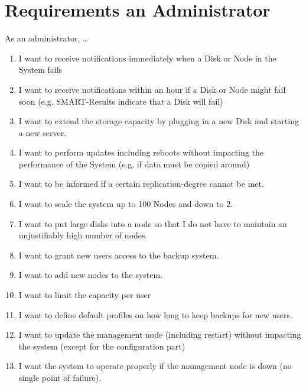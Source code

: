 \section{Requirements an Administrator}

As an administrator, \ldots{}

\begin{enumerate}
	\item
	I want to receive notifications immediately when a Disk or Node in the
	System fails
	\item
	I want to receive notifications within an hour if a Disk or Node might
	fail soon (e.g. SMART-Results indicate that a Disk will fail)
	\item
	I want to extend the storage capacity by plugging in a new Disk and
	starting a new server.
	\item
	I want to perform updates including reboots without impacting the
	performance of the System (e.g. if data must be copied around)
	\item
	I want to be informed if a certain replication-degree cannot be met.
	\item
	I want to scale the system up to 100 Nodes and down to 2.
	\item
	I want to put large disks into a node so that I do not have to
	maintain an unjustifiably high number of nodes.
	\item
	I want to grant new users access to the backup system.
	\item
	I want to add new nodes to the system.
	\item
	I want to limit the capacity per user
	\item
	I want to define default profiles on how long to keep backups for new
	users.
	\item
	I want to update the management node (including restart) without
	impacting the system (except for the configuration part)
	\item
	I want the system to operate properly if the management node is down
	(no single point of failure).
\end{enumerate}

